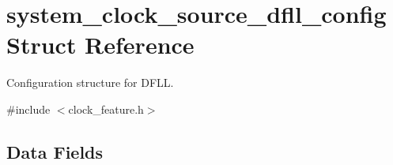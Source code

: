 \hypertarget{structsystem__clock__source__dfll__config}{}\section{system\+\_\+clock\+\_\+source\+\_\+dfll\+\_\+config Struct Reference}
\label{structsystem__clock__source__dfll__config}


Configuration structure for D\+F\+LL.  




{\ttfamily \#include $<$clock\+\_\+feature.\+h$>$}

\subsection*{Data Fields}

